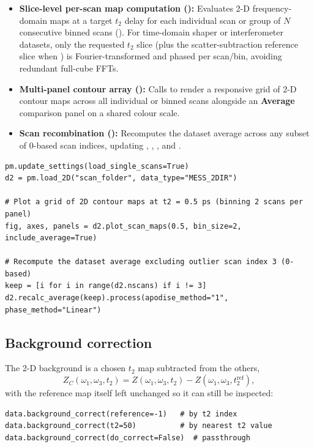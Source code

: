 \begin{itemize}
  \item \textbf{Slice-level per-scan map computation ():} Evaluates 2-D frequency-domain maps  at a target $t_2$ delay for each individual scan or group of $N$ consecutive binned scans (). For time-domain shaper or interferometer datasets, only the requested $t_2$ slice (plus the scatter-subtraction reference slice when ) is Fourier-transformed and phased per scan/bin, avoiding redundant full-cube FFTs.
  \item \textbf{Multi-panel contour array ():} Calls  to render a responsive grid of 2-D contour maps across all individual or binned scans alongside an \textbf{Average} comparison panel on a shared colour scale.
  \item \textbf{Scan recombination ():} Recomputes the dataset average across any subset of 0-based scan indices, updating , , , and .
\end{itemize}

\begin{lstlisting}
pm.update_settings(load_single_scans=True)
d2 = pm.load_2D("scan_folder", data_type="MESS_2DIR")

# Plot a grid of 2D contour maps at t2 = 0.5 ps (binning 2 scans per panel)
fig, axes, panels = d2.plot_scan_maps(0.5, bin_size=2, include_average=True)

# Recompute the dataset average excluding outlier scan index 3 (0-based)
keep = [i for i in range(d2.nscans) if i != 3]
d2.recalc_average(keep).process(apodise_method="1", phase_method="Linear")
\end{lstlisting}

\subsection{Background correction}
The 2-D background is a chosen $t_2$ map subtracted from the others,
\begin{equation}
  Z_C(\omega_1,\omega_3,t_2) = Z(\omega_1,\omega_3,t_2) - Z(\omega_1,\omega_3,t_2^{\text{ref}}),
\end{equation}
with the reference map itself left unchanged so it can still be inspected:

\begin{lstlisting}
data.background_correct(reference=-1)   # by t2 index
data.background_correct(t2=50)          # by nearest t2 value
data.background_correct(do_correct=False)  # passthrough
\end{lstlisting}


